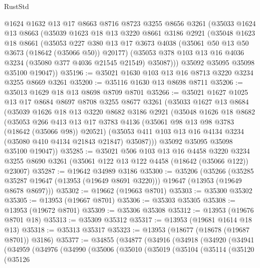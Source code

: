 \begin{lexlean}{RustStd}
\begin{coremodule}
    @1624
    @1632
    @13
    @17
    @8663
    @8716
    @8723
    @3255
    @8656
    @3261
    (@35033
      @1624
      @13
      @8663
      (@35039
        @1623
        @18
        @13
        @3220
        @8661
        @3186
        @2921
        (@35048
          @1623
          @18
          @8661
          (@35053
            @227
            @380
            @13
            @17
            @3673
            @4038
            (@35061 @50 @13 @50 @3673 (@18642 (@35066 @50)) @20177)
            (@35053 @378 @103 @13 @16 @4036 @3234 (@35080 @377 @4036 @21545 @21549) @35087)))
        @35092
        @35095
        @35098
        @35100
        @19047))
@35196 := @35021 @1630 @103 @13 @16 @8713 @3220 @3234 @3255 @8669 @3261
@35200 := @35116 @1630 @13 @8698 @8711
@35206 := @35013 @1629 @18 @13 @8698 @8709 @8701
@35266 := @35021
    @1627
    @1025
    @13
    @17
    @8684
    @8697
    @8708
    @3255
    @8677
    @3261
    (@35033
      @1627
      @13
      @8684
      (@35039
        @1626
        @18
        @13
        @3220
        @8682
        @3186
        @2921
        (@35048
          @1626
          @18
          @8682
          (@35053
            @266
            @413
            @13
            @17
            @3783
            @4136
            (@35061 @98 @13 @98 @3783 (@18642 (@35066 @98)) @20521)
            (@35053 @411 @103 @13 @16 @4134 @3234 (@35080 @410 @4134 @21843 @21847) @35087)))
        @35092
        @35095
        @35098
        @35100
        @19047))
@35285 := @35021
    @506
    @103
    @13
    @16
    @4458
    @3220
    @3234
    @3255
    @8690
    @3261
    (@35061 @122 @13 @122 @4458 (@18642 (@35066 @122)) @23007)
@35287 := @19642 @34989 @3186
@35300 := @35206
    (@35266
      (@35285 @35287 @19647 (@13953 (@19649 @8691 @3220)))
      @19647
      (@13953 (@19649 @8678 @8697)))
@35302 := @19662 (@19663 @8701)
@35303 := @35300 @35302
@35305 := @13953 (@19667 @8701)
@35306 := @35303 @35305
@35308 := @13953 (@19672 @8701)
@35309 := @35306 @35308
@35312 := @13953 (@19676 @8701 @18)
@35313 := @35309 @35312
@35317 := @13953 (@19681 @1614 @18 @13)
@35318 := @35313 @35317
@35323 := @13953 (@18677 (@18678 (@19687 @8701)) @3186)
@35377 := @34855
    (@34877
      (@34916
        (@34918
          (@34920
            (@34941
              (@34959
                (@34976
                  (@34990
                    (@35006
                      (@35010
                        (@35019
                          (@35104
                            (@35114
                              (@35120
                                (@35126

\end{coremodule}
\end{lexlean}
